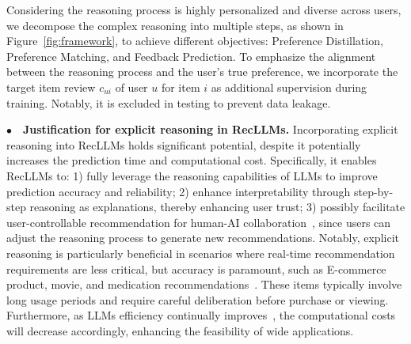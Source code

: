 Considering the reasoning process is highly personalized and diverse across users, we decompose the complex reasoning into multiple steps, as shown in Figure~\ref{fig:framework}, to achieve different objectives: Preference Distillation, Preference Matching, and Feedback Prediction. 
To emphasize the alignment between the reasoning process and the user's true preference, we incorporate the target item review $c_{ui}$ of user $u$ for item $i$ as additional supervision during training. 
Notably, it is excluded in testing to prevent data leakage. 


\vspace{3pt}
\noindent$\bullet\quad$\textbf{Justification for explicit reasoning in RecLLMs.} 
Incorporating explicit reasoning into RecLLMs holds significant potential, despite it potentially increases the prediction time and computational cost. 
Specifically, it enables RecLLMs to: 1) fully leverage the reasoning capabilities of LLMs to improve prediction accuracy and reliability; 
2) enhance interpretability through step-by-step reasoning as explanations, thereby enhancing user trust; 
3) possibly facilitate user-controllable recommendation for human-AI collaboration~\cite{yang-etal-2024-human}, since users can adjust the reasoning process to generate new recommendations. 
Notably, explicit reasoning is particularly beneficial in scenarios where real-time recommendation requirements are less critical, but accuracy is paramount, such as E-commerce product, movie, and medication recommendations~\cite{drugRec}. 
These items typically involve long usage periods and require careful deliberation before purchase or viewing. 
Furthermore, as LLMs efficiency continually improves~\cite{data_efficient}, the computational costs will decrease accordingly, enhancing the feasibility of wide applications. 
